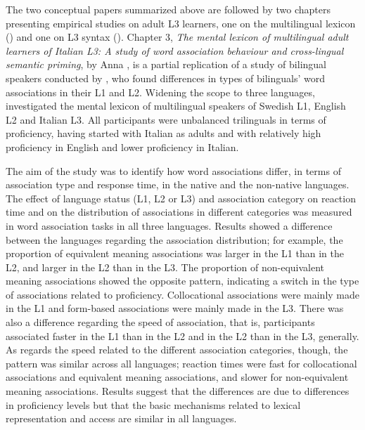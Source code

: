 \documentclass[output=paper,colorlinks,citecolor=brown,nonflat]{langsci/langscibook}
\begin{document}
The two conceptual papers summarized above are followed by two chapters presenting empirical studies on adult L3 learners, one on the multilingual lexicon (\citeauthor{chapters/gudmundson}) and one on L3 syntax (\citeauthor{chapters/sciutti}). Chapter 3, \textit{The mental lexicon of multilingual adult learners of Italian L3: A study of word association behaviour and cross-lingual semantic priming}, by Anna \citeauthor{chapters/gudmundson}, is a partial replication of a study of bilingual speakers conducted by \citet{FitzpatrickIzura2011}, who found differences in types of bilinguals’ word associations in their L1 and L2. Widening the scope to three languages, \citeauthor{chapters/gudmundson} investigated the mental lexicon of multilingual speakers of Swedish L1, English L2 and Italian L3. All participants were unbalanced trilinguals in terms of proficiency, having started with Italian as adults and with relatively high proficiency in English and lower proficiency in Italian.

The aim of the study was to identify how word associations differ, in terms of association type and response time, in the native and the non-native languages. The effect of language status (L1, L2 or L3) and association category on reaction time and on the distribution of associations in different categories was measured in word association tasks in all three languages. Results showed a difference between the languages regarding the association distribution; for example, the proportion of equivalent meaning associations was larger in the L1 than in the L2, and larger in the L2 than in the L3. The proportion of non-equivalent meaning associations showed the opposite pattern, indicating a switch in the type of associations related to proficiency. Collocational associations were mainly made in the L1 and form-based associations were mainly made in the L3. There was also a difference regarding the speed of association, that is, participants associated faster in the L1 than in the L2 and in the L2 than in the L3, generally. As regards the speed related to the different association categories, though, the pattern was similar across all languages; reaction times were fast for collocational associations and equivalent meaning associations, and slower for non-equivalent meaning associations. Results suggest that the differences are due to differences in proficiency levels but that the basic mechanisms related to lexical representation and access are similar in all languages.
\end{document}
